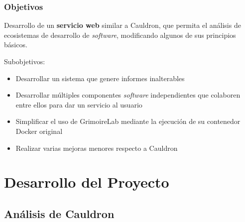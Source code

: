 \documentclass[
	11pt, %
	aspectratio=169, %
]{beamer}
\begin{document}
\begin{frame}
	\frametitle{Objetivos}

	Desarrollo de un \textbf{servicio web} similar a Cauldron, que permita el análisis de ecosistemas de desarrollo de \emph{software}, modificando algunos de sus principios básicos.

	\bigskip %

	Subobjetivos:

	\begin{itemize}
		\item Desarrollar un sistema que genere informes inalterables
		\item Desarrollar múltiples componentes \emph{software} independientes que colaboren entre ellos para dar un servicio al usuario
		\item Simplificar el uso de GrimoireLab mediante la ejecución de su contenedor Docker original
		\item Realizar varias mejoras menores respecto a Cauldron
	\end{itemize}
\end{frame}


\section{Desarrollo del Proyecto}


\subsection[]{Análisis de Cauldron}
\end{document}
